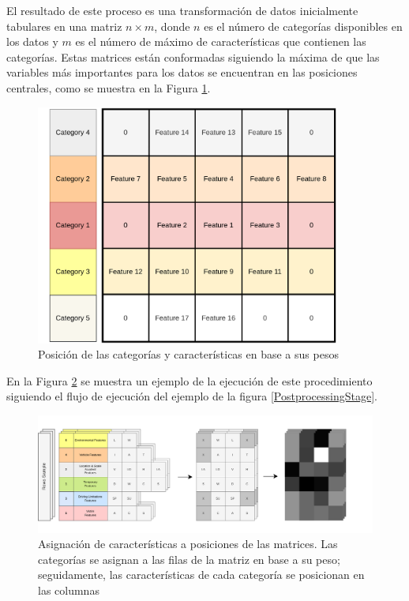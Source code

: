 El resultado de este proceso es una transformación de datos inicialmente tabulares en una matriz $n \times m$, donde $n$ es el número de categorías disponibles en los datos y $m$ es el número de máximo de características que contienen las categorías. Estas matrices están conformadas siguiendo la máxima de que las variables más importantes para los datos se encuentran en las posiciones centrales, como se muestra en la Figura \ref{MatrixIndexes}.


\begin{figure}[H]
	\centering
	\includegraphics[width=10cm]{Figures/indexing_positions_2.png}
	\caption{Posición de las categorías y características en base a sus pesos}
	\label{MatrixIndexes}
\end{figure}

En la Figura \ref{MatrixConstruction} se muestra un ejemplo de la ejecución de este procedimiento siguiendo el flujo de ejecución del ejemplo de la figura \ref{PostprocessingStage}.

\begin{figure}[H]
	\centering
	\includegraphics[width=15cm]{Figures/Matrix Construction_2.png}
	\caption[Asignación de características a posiciones de las matrices]{Asignación de características a posiciones de las matrices. Las categorías se asignan a las filas de la matriz en base a su peso; seguidamente, las características de cada categoría se posicionan en las columnas}
	\label{MatrixConstruction}
\end{figure}

